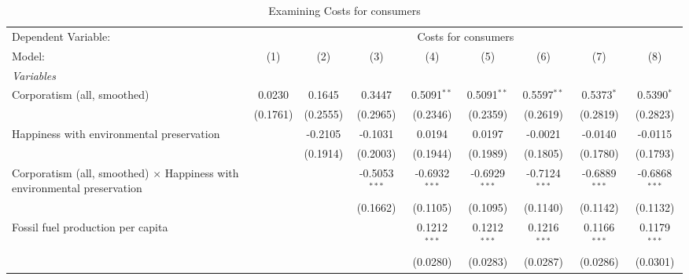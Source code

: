 
\begin{table}[htbp]
   \caption{Examining Costs for consumers}
   \centering
   \begin{tabular}{lcccccccc}
      \tabularnewline \midrule \midrule
      Dependent Variable: & \multicolumn{8}{c}{Costs for consumers}\\
      Model:                                                                          & (1)      & (2)      & (3)             & (4)             & (5)             & (6)             & (7)             & (8)\\  
      \midrule
      \emph{Variables}\\
      Corporatism (all, smoothed)                                                     & 0.0230   & 0.1645   & 0.3447          & 0.5091$^{**}$   & 0.5091$^{**}$   & 0.5597$^{**}$   & 0.5373$^{*}$    & 0.5390$^{*}$\\   
                                                                                      & (0.1761) & (0.2555) & (0.2965)        & (0.2346)        & (0.2359)        & (0.2619)        & (0.2819)        & (0.2823)\\   
      Happiness with environmental preservation                                       &          & -0.2105  & -0.1031         & 0.0194          & 0.0197          & -0.0021         & -0.0140         & -0.0115\\   
                                                                                      &          & (0.1914) & (0.2003)        & (0.1944)        & (0.1989)        & (0.1805)        & (0.1780)        & (0.1793)\\   
      Corporatism (all, smoothed) $\times$ Happiness with environmental preservation  &          &          & -0.5053$^{***}$ & -0.6932$^{***}$ & -0.6929$^{***}$ & -0.7124$^{***}$ & -0.6889$^{***}$ & -0.6868$^{***}$\\   
                                                                                      &          &          & (0.1662)        & (0.1105)        & (0.1095)        & (0.1140)        & (0.1142)        & (0.1132)\\   
      Fossil fuel production per capita                                               &          &          &                 & 0.1212$^{***}$  & 0.1212$^{***}$  & 0.1216$^{***}$  & 0.1166$^{***}$  & 0.1179$^{***}$\\   
                                                                                      &          &          &                 & (0.0280)        & (0.0283)        & (0.0287)        & (0.0286)        & (0.0301)\\   

\end{tabular}
\end{table}
